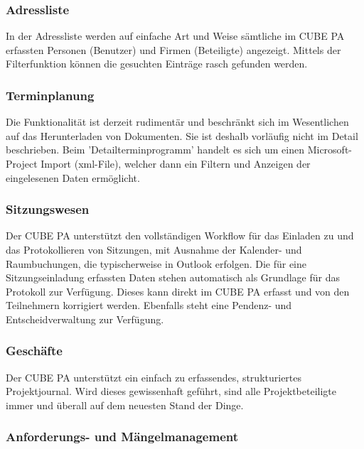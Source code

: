 \vspace{4cm} 

\subsubsection{Adressliste}

In der Adressliste werden auf einfache Art und Weise sämtliche im CUBE PA erfassten Personen (Benutzer) und Firmen (Beteiligte) angezeigt. Mittels der Filterfunktion können die gesuchten Einträge rasch gefunden werden.

\subsubsection{Terminplanung}

Die Funktionalität ist derzeit rudimentär und beschränkt sich im Wesentlichen auf das Herunterladen von Dokumenten. Sie ist deshalb vorläufig nicht im Detail beschrieben. Beim 'Detailterminprogramm' handelt es sich um einen Microsoft-Project Import (xml-File), welcher dann ein Filtern und Anzeigen der eingelesenen Daten ermöglicht.

\subsubsection{Sitzungswesen}

Der CUBE PA unterstützt den vollständigen Workflow für das Einladen zu und das Protokollieren von Sitzungen, mit Ausnahme der Kalender- und Raumbuchungen, die typischerweise in Outlook erfolgen. Die für eine Sitzungseinladung erfassten Daten stehen automatisch als Grundlage für das Protokoll zur Verfügung. Dieses kann direkt im CUBE PA erfasst und von den Teilnehmern korrigiert werden. Ebenfalls steht eine Pendenz- und Entscheidverwaltung zur Verfügung.

\subsubsection{Geschäfte}

Der CUBE PA unterstützt ein einfach zu erfassendes, strukturiertes Projektjournal. Wird dieses gewissenhaft geführt, sind alle Projektbeteiligte immer und überall auf dem neuesten Stand der Dinge.

\subsubsection{Anforderungs- und Mängelmanagement}

